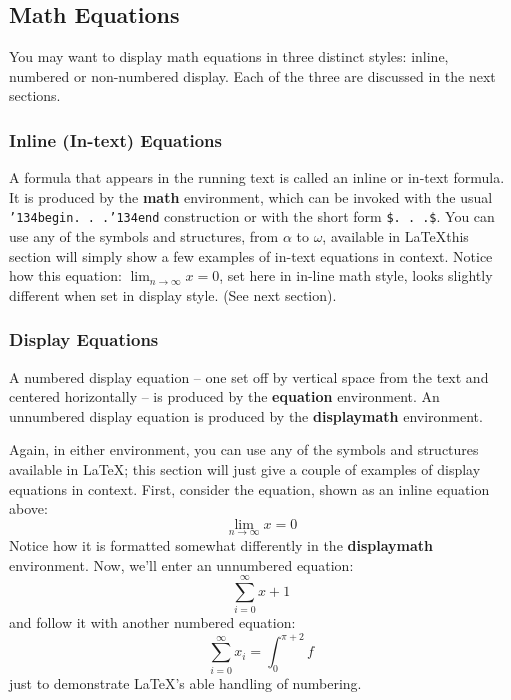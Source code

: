 \documentclass{acm_proc_article-sp}
\begin{document}
\subsection{Math Equations}
You may want to display math equations in three distinct styles:
inline, numbered or non-numbered display. Each of
the three are discussed in the next sections.

\subsubsection{Inline (In-text) Equations}
A formula that appears in the running text is called an
inline or in-text formula.  It is produced by the
\textbf{math} environment, which can be
invoked with the usual \texttt{{\char'134}begin. . .{\char'134}end}
construction or with the short form \texttt{\$. . .\$}. You
can use any of the symbols and structures,
from $\alpha$ to $\omega$, available in
\LaTeX this section will simply show a
few examples of in-text equations in context. Notice how
this equation: \begin{math}\lim_{n\rightarrow \infty}x=0\end{math},
set here in in-line math style, looks slightly different when
set in display style.  (See next section).

\subsubsection{Display Equations}
A numbered display equation -- one set off by vertical space
from the text and centered horizontally -- is produced
by the \textbf{equation} environment. An unnumbered display
equation is produced by the \textbf{displaymath} environment.

Again, in either environment, you can use any of the symbols
and structures available in \LaTeX; this section will just
give a couple of examples of display equations in context.
First, consider the equation, shown as an inline equation above:
\begin{equation}\lim_{n\rightarrow \infty}x=0\end{equation}
Notice how it is formatted somewhat differently in
the \textbf{displaymath}
environment.  Now, we'll enter an unnumbered equation:
\begin{displaymath}\sum_{i=0}^{\infty} x + 1\end{displaymath}
and follow it with another numbered equation:
\begin{equation}\sum_{i=0}^{\infty}x_i=\int_{0}^{\pi+2} f\end{equation}
just to demonstrate \LaTeX's able handling of numbering.
\end{document}
